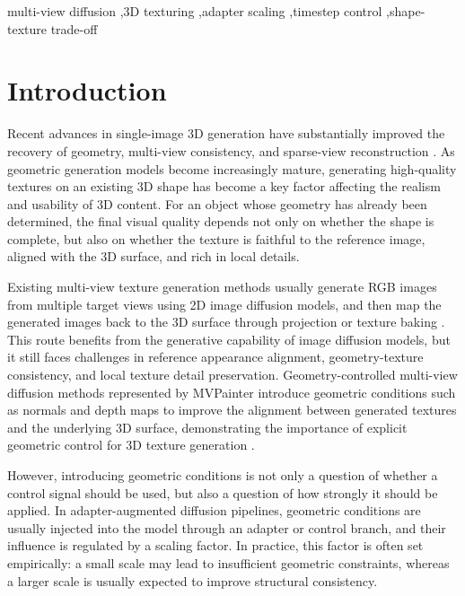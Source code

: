 \documentclass[times,twocolumn,final]{elsarticle}
\begin{document}
\begin{frontmatter}
\begin{abstract}
\end{abstract}

\begin{keyword}
\KWD
multi-view diffusion \sep 3D texturing \sep adapter scaling \sep timestep control \sep shape-texture trade-off
\end{keyword}

\end{frontmatter}

\linenumbers

\section{Introduction}
\label{sec:intro}

Recent advances in single-image 3D generation have substantially improved the recovery of geometry, multi-view consistency, and sparse-view reconstruction \cite{liu2023zero1to3,shi2023zero123pp,liu2023syncdreamer,long2023wonder3d,shi2024mvdream,wang2023imagedream,xu2024instantmesh,ke2024era3d}. As geometric generation models become increasingly mature, generating high-quality textures on an existing 3D shape has become a key factor affecting the realism and usability of 3D content. For an object whose geometry has already been determined, the final visual quality depends not only on whether the shape is complete, but also on whether the texture is faithful to the reference image, aligned with the 3D surface, and rich in local details.

Existing multi-view texture generation methods usually generate RGB images from multiple target views using 2D image diffusion models, and then map the generated images back to the 3D surface through projection or texture baking \cite{chen2023text2tex,richardson2023texture,poole2023dreamfusion,chen2023fantasia3d}. This route benefits from the generative capability of image diffusion models, but it still faces challenges in reference appearance alignment, geometry-texture consistency, and local texture detail preservation. Geometry-controlled multi-view diffusion methods represented by MVPainter introduce geometric conditions such as normals and depth maps to improve the alignment between generated textures and the underlying 3D surface, demonstrating the importance of explicit geometric control for 3D texture generation \cite{shao2025mvpainter}.

However, introducing geometric conditions is not only a question of whether a control signal should be used, but also a question of how strongly it should be applied. In adapter-augmented diffusion pipelines, geometric conditions are usually injected into the model through an adapter or control branch, and their influence is regulated by a scaling factor. In practice, this factor is often set empirically: a small scale may lead to insufficient geometric constraints, whereas a larger scale is usually expected to improve structural consistency.
\end{document}
